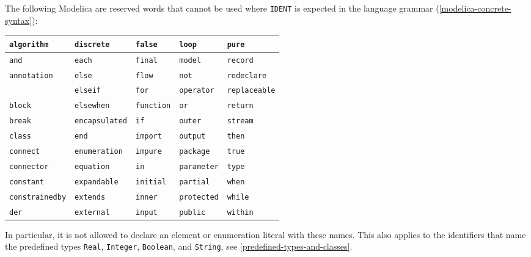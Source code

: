 The following Modelica  are reserved words that cannot be used where \lstinline[language=grammar]!IDENT! is expected in the language grammar (\cref{modelica-concrete-syntax}):
\begin{center}
\begin{tabular}{l l l l l}
{\lstinline!algorithm!} & {\lstinline!discrete!} & {\lstinline!false!} & {\lstinline!loop!} & {\lstinline!pure!}\\ \hline
{\lstinline!and!} & {\lstinline!each!} & {\lstinline!final!} & {\lstinline!model!} & {\lstinline!record!}\\ \hline
{\lstinline!annotation!} & {\lstinline!else!} & {\lstinline!flow!} & {\lstinline!not!} & {\lstinline!redeclare!}\\ \hline
& {\lstinline!elseif!} & {\lstinline!for!} & {\lstinline!operator!} & {\lstinline!replaceable!}\\ \hline
{\lstinline!block!} & {\lstinline!elsewhen!} & {\lstinline!function!} & {\lstinline!or!} & {\lstinline!return!}\\ \hline
{\lstinline!break!} & {\lstinline!encapsulated!} & {\lstinline!if!} & {\lstinline!outer!} & {\lstinline!stream!}\\ \hline
{\lstinline!class!} & {\lstinline!end!} & {\lstinline!import!} & {\lstinline!output!} & {\lstinline!then!}\\ \hline
{\lstinline!connect!} & {\lstinline!enumeration!} & {\lstinline!impure!} & {\lstinline!package!} & {\lstinline!true!}\\ \hline
{\lstinline!connector!} & {\lstinline!equation!} & {\lstinline!in!} & {\lstinline!parameter!} & {\lstinline!type!}\\ \hline
{\lstinline!constant!} & {\lstinline!expandable!} & {\lstinline!initial!} & {\lstinline!partial!} & {\lstinline!when!}\\ \hline
{\lstinline!constrainedby!} & {\lstinline!extends!} & {\lstinline!inner!} & {\lstinline!protected!} & {\lstinline!while!}\\ \hline
{\lstinline!der!} & {\lstinline!external!} & {\lstinline!input!} & {\lstinline!public!} & {\lstinline!within!}\\
\end{tabular}
\end{center}

In particular, it is not allowed to declare an element or enumeration literal with these names.
This also applies to the identifiers that name the predefined types \lstinline!Real!, \lstinline!Integer!, \lstinline!Boolean!, and \lstinline!String!, see \cref{predefined-types-and-classes}.


